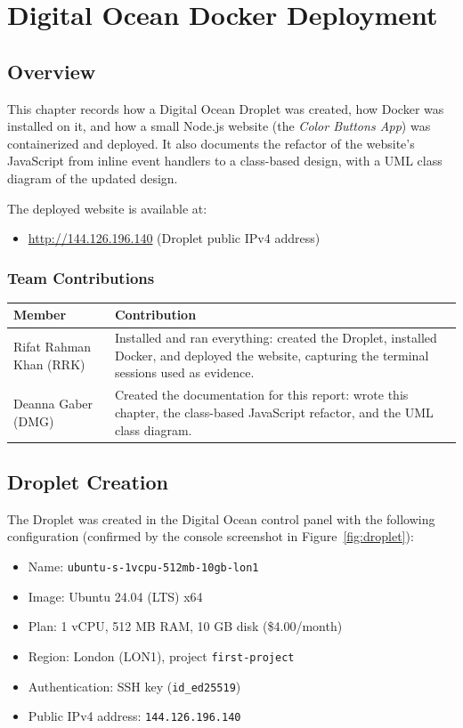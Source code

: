 \chapter{Digital Ocean Docker Deployment}

\section{Overview}
This chapter records how a Digital Ocean Droplet was created, how Docker was
installed on it, and how a small Node.js website (the \emph{Color Buttons App})
was containerized and deployed. It also documents the refactor of the website's
JavaScript from inline event handlers to a class-based design, with a UML class
diagram of the updated design.

The deployed website is available at:
\begin{itemize}
  \item \url{http://144.126.196.140} (Droplet public IPv4 address)
\end{itemize}

\subsection{Team Contributions}
\begin{tabularx}{\linewidth}{L{4.0cm}Y}
\toprule \textbf{Member} & \textbf{Contribution}\\ \midrule
Rifat Rahman Khan (RRK) & Installed and ran everything: created the Droplet, installed Docker, and deployed the website, capturing the terminal sessions used as evidence.\\
Deanna Gaber (DMG) & Created the documentation for this report: wrote this chapter, the class-based JavaScript refactor, and the UML class diagram.\\ \bottomrule
\end{tabularx}

\section{Droplet Creation}
The Droplet was created in the Digital Ocean control panel with the following
configuration (confirmed by the console screenshot in
Figure~\ref{fig:droplet}):

\begin{itemize}
  \item Name: \texttt{ubuntu-s-1vcpu-512mb-10gb-lon1}
  \item Image: Ubuntu 24.04 (LTS) x64
  \item Plan: 1 vCPU, 512 MB RAM, 10 GB disk (\$4.00/month)
  \item Region: London (LON1), project \texttt{first-project}
  \item Authentication: SSH key (\texttt{id\_ed25519})
  \item Public IPv4 address: \texttt{144.126.196.140}
\end{itemize}


